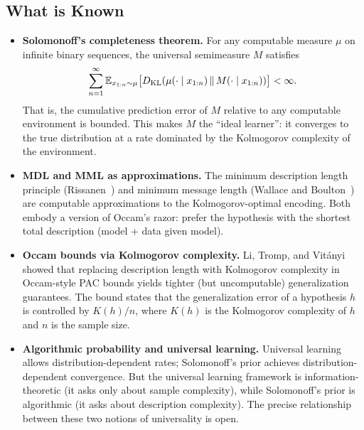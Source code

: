 \subsection{What is Known}

\begin{itemize}[leftmargin=*]
\item \textbf{Solomonoff's completeness theorem.}  For any computable
  measure $\mu$ on infinite binary sequences, the universal semimeasure $M$
  satisfies
  \[
    \sum_{n=1}^\infty \mathbb{E}_{x_{1:n} \sim \mu}
    \bigl[D_{\mathrm{KL}}(\mu(\cdot \mid x_{1:n}) \,\|\,
    M(\cdot \mid x_{1:n}))\bigr] < \infty.
  \]
  That is, the cumulative prediction error of $M$ relative to any
  computable environment is bounded.  This makes $M$ the ``ideal learner'':
  it converges to the true distribution at a rate dominated by the
  Kolmogorov complexity of the environment.

\item \textbf{MDL and MML as approximations.}  The minimum description
  length principle (Rissanen~\cite{Rissanen1984}) and minimum message length
  (Wallace and Boulton~\cite{WallaceBoulton1968}) are computable
  approximations to the Kolmogorov-optimal encoding.  Both embody a version
  of Occam's razor: prefer the hypothesis with the shortest total description
  (model + data given model).

\item \textbf{Occam bounds via Kolmogorov complexity.}  Li, Tromp, and
  Vit\'anyi~\cite{LiVitanyi2008} showed that replacing description length
  with Kolmogorov complexity in Occam-style PAC bounds yields tighter
  (but uncomputable) generalization guarantees.  The bound states that
  the generalization error of a hypothesis $h$ is controlled by
  $K(h)/n$, where $K(h)$ is the Kolmogorov complexity of $h$ and $n$
  is the sample size.

\item \textbf{Algorithmic probability and universal learning.}  Universal
  learning allows distribution-dependent rates; Solomonoff's prior achieves
  distribution-dependent convergence.  But the universal learning framework is
  information-theoretic (it asks only about sample complexity), while
  Solomonoff's prior is algorithmic (it asks about description complexity).
  The precise relationship between these two notions of universality is open.
\end{itemize}

